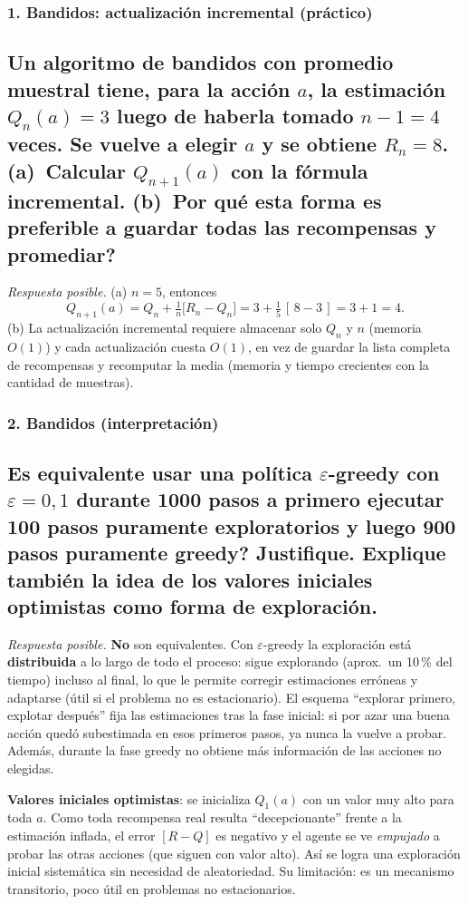 \documentclass[11pt, a4paper]{article}
\newcommand{\pregunta}[1]{\subsection{#1}}
\newcommand{\eje}[1]{\subsubsection{#1}}
\begin{document}
\eje{1. Bandidos: actualizaci\'on incremental (pr\'actico)}
\pregunta{Un algoritmo de bandidos con promedio muestral tiene, para la acci\'on $a$, la estimaci\'on $Q_n(a)=3$ luego de haberla tomado $n-1=4$ veces. Se vuelve a elegir $a$ y se obtiene $R_n = 8$. (a)~Calcular $Q_{n+1}(a)$ con la f\'ormula incremental. (b)~\textquestiondown Por qu\'e esta forma es preferible a guardar todas las recompensas y promediar?}

\begin{respuesta}
\textit{Respuesta posible.} (a) $n=5$, entonces
\[
Q_{n+1}(a) = Q_n + \tfrac{1}{n}\big[R_n - Q_n\big] = 3 + \tfrac{1}{5}\,[\,8-3\,] = 3 + 1 = 4.
\]
(b) La actualizaci\'on incremental requiere almacenar solo $Q_n$ y $n$ (memoria $O(1)$) y cada actualizaci\'on cuesta $O(1)$, en vez de guardar la lista completa de recompensas y recomputar la media (memoria y tiempo crecientes con la cantidad de muestras).
\end{respuesta}

\eje{2. Bandidos (interpretaci\'on)}
\pregunta{\textquestiondown Es equivalente usar una pol\'itica $\varepsilon$-greedy con $\varepsilon=0{,}1$ durante 1000 pasos a primero ejecutar 100 pasos puramente exploratorios y luego 900 pasos puramente greedy? Justifique. Explique tambi\'en la idea de los \textbf{valores iniciales optimistas} como forma de exploraci\'on.}

\begin{respuesta}
\textit{Respuesta posible.} \textbf{No} son equivalentes. Con $\varepsilon$-greedy la exploraci\'on est\'a \textbf{distribuida} a lo largo de todo el proceso: sigue explorando (aprox.\ un 10\,\% del tiempo) incluso al final, lo que le permite corregir estimaciones err\'oneas y adaptarse (\'util si el problema no es estacionario). El esquema ``explorar primero, explotar despu\'es'' fija las estimaciones tras la fase inicial: si por azar una buena acci\'on qued\'o subestimada en esos primeros pasos, ya nunca la vuelve a probar. Adem\'as, durante la fase greedy no obtiene m\'as informaci\'on de las acciones no elegidas.

\textbf{Valores iniciales optimistas}: se inicializa $Q_1(a)$ con un valor muy alto para toda $a$. Como toda recompensa real resulta ``decepcionante'' frente a la estimaci\'on inflada, el error $[R-Q]$ es negativo y el agente se ve \emph{empujado} a probar las otras acciones (que siguen con valor alto). As\'i se logra una exploraci\'on inicial sistem\'atica sin necesidad de aleatoriedad. Su limitaci\'on: es un mecanismo transitorio, poco \'util en problemas no estacionarios.
\end{respuesta}
\end{document}
